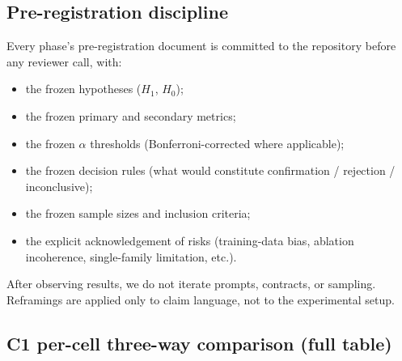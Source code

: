 \subsection{Pre-registration discipline}

Every phase's pre-registration document is committed to the repository before any reviewer call, with:
\begin{itemize}[leftmargin=2em]
\item the frozen hypotheses ($H_1$, $H_0$);
\item the frozen primary and secondary metrics;
\item the frozen $\alpha$ thresholds (Bonferroni-corrected where applicable);
\item the frozen decision rules (what would constitute confirmation / rejection / inconclusive);
\item the frozen sample sizes and inclusion criteria;
\item the explicit acknowledgement of risks (training-data bias, ablation incoherence, single-family limitation, etc.).
\end{itemize}
After observing results, we do not iterate prompts, contracts, or sampling. Reframings are applied only to claim language, not to the experimental setup.

\subsection{C1 per-cell three-way comparison (full table)}
\label{app:me-per-cell-full}


